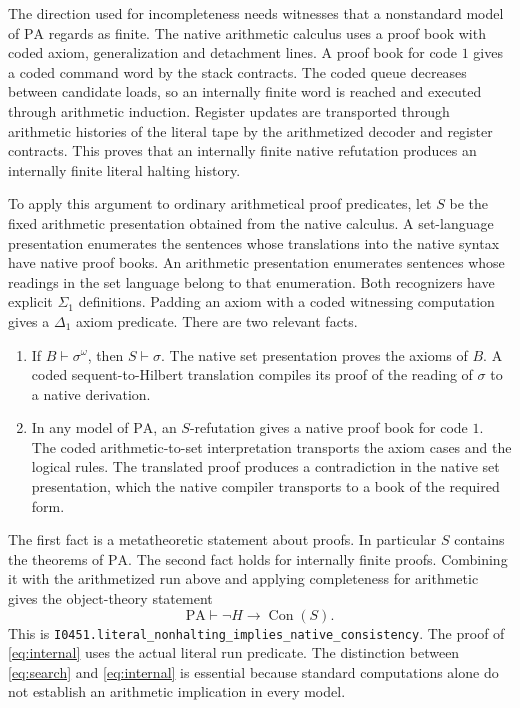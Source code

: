\documentclass[11pt,letterpaper]{article}
\theoremstyle{definition}
\newcommand{\PA}{\mathrm{PA}}
\newcommand{\Con}{\operatorname{Con}}
\newcommand{\setread}[1]{#1^{\omega}}
\newcommand{\file}[1]{\texttt{\nolinkurl{#1}}}
\begin{document}
The direction used for incompleteness needs witnesses that a
nonstandard model of $\PA$ regards as finite. The native arithmetic
calculus uses a proof book with coded axiom, generalization and
detachment lines. A proof book for code $1$ gives a coded command
word by the stack contracts. The coded queue decreases between
candidate loads, so an internally finite word is reached and
executed through arithmetic induction. Register updates are
transported through arithmetic histories of the literal tape by
the arithmetized decoder and register contracts. This proves
that an internally finite native refutation produces an
internally finite literal halting history.

To apply this argument to ordinary arithmetical proof predicates,
let $S$ be the fixed arithmetic presentation obtained from the
native calculus. A set-language presentation enumerates the
sentences whose translations into the native syntax have native
proof books. An arithmetic presentation enumerates sentences
whose readings in the set language belong to that enumeration.
Both recognizers have explicit $\Sigma_1$ definitions. Padding
an axiom with a coded witnessing computation gives a
$\Delta_1$ axiom predicate. There are two relevant facts.
\begin{enumerate}
\item If $B\vdash\setread{\sigma}$, then $S\vdash\sigma$.
      The native set presentation proves the axioms of $B$.
      A coded sequent-to-Hilbert translation compiles its proof
      of the reading of $\sigma$ to a native derivation.
\item In any model of $\PA$, an $S$-refutation gives a native
      proof book for code $1$. The coded arithmetic-to-set
      interpretation transports the axiom cases and the logical
      rules. The translated proof produces a contradiction in the
      native set presentation, which the native compiler transports
      to a book of the required form.
\end{enumerate}
The first fact is a metatheoretic statement about proofs. In
particular $S$ contains the theorems of $\PA$. The second fact
holds for internally finite proofs. Combining it with the
arithmetized run above and applying completeness for arithmetic
gives the object-theory statement
\begin{equation}\label{eq:internal}
  \PA\vdash \neg H\longrightarrow\Con(S).
\end{equation}
This is \file{I0451.literal_nonhalting_implies_native_consistency}.
The proof of \eqref{eq:internal} uses the actual literal run
predicate. The distinction between \eqref{eq:search} and
\eqref{eq:internal} is essential because standard computations alone
do not establish an arithmetic implication in every model.
\end{document}
